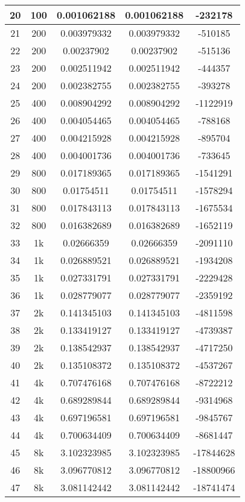 \begin{center}
\begin{longtable}{|c|c|c|c|c|}
		20 & 100 & 0.001062188 & 0.001062188 & -232178\\
		\hline
		21 & 200 & 0.003979332 & 0.003979332 & -510185\\
		22 & 200 & 0.00237902 & 0.00237902 & -515136\\
		23 & 200 & 0.002511942 & 0.002511942 & -444357\\
		24 & 200 & 0.002382755 & 0.002382755 & -393278\\
		\hline
		25 & 400 & 0.008904292 & 0.008904292 & -1122919\\
		26 & 400 & 0.004054465 & 0.004054465 & -788168\\
		27 & 400 & 0.004215928 & 0.004215928 & -895704\\
		28 & 400 & 0.004001736 & 0.004001736 & -733645\\
		\hline
		29 & 800 & 0.017189365 & 0.017189365 & -1541291\\
		30 & 800 & 0.01754511 & 0.01754511 & -1578294\\
		31 & 800 & 0.017843113 & 0.017843113 & -1675534\\
		32 & 800 & 0.016382689 & 0.016382689 & -1652119\\
		\hline
		33 & 1k & 0.02666359 & 0.02666359 & -2091110\\
		34 & 1k & 0.026889521 & 0.026889521 & -1934208\\
		35 & 1k & 0.027331791 & 0.027331791 & -2229428\\
		36 & 1k & 0.028779077 & 0.028779077 & -2359192\\
		\hline
		37 & 2k & 0.141345103 & 0.141345103 & -4811598\\
		38 & 2k & 0.133419127 & 0.133419127 & -4739387\\
		39 & 2k & 0.138542937 & 0.138542937 & -4717250\\
		40 & 2k & 0.135108372 & 0.135108372 & -4537267\\
		\hline
		41 & 4k & 0.707476168 & 0.707476168 & -8722212\\
		42 & 4k & 0.689289844 & 0.689289844 & -9314968\\
		43 & 4k & 0.697196581 & 0.697196581 & -9845767\\
		44 & 4k & 0.700634409 & 0.700634409 & -8681447\\
		\hline
		45 & 8k & 3.102323985 & 3.102323985 & -17844628\\
		46 & 8k & 3.096770812 & 3.096770812 & -18800966\\
		47 & 8k & 3.081142442 & 3.081142442 & -18741474\\

\end{longtable}
\end{center}
